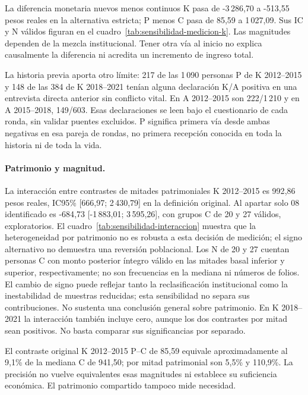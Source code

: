 La diferencia monetaria nuevos menos continuos K pasa de -3\,286{,}70 a
-513{,}55 pesos reales en la alternativa estricta; P menos C pasa de
85{,}59 a 1\,027{,}09. Sus IC y N válidos figuran en el
cuadro~\ref{tab:sensibilidad-medicion-k}. Las magnitudes dependen de la
mezcla institucional. Tener otra vía al inicio no explica causalmente
la diferencia ni acredita un incremento de ingreso total.

La historia previa aporta otro límite: 217 de las 1\,090 personas P de
K 2012--2015 y 148 de las 384 de K 2018--2021 tenían alguna declaración
K/A positiva en una entrevista directa anterior sin conflicto vital. En
A 2012--2015 son 222/1\,210 y en A 2015--2018, 149/603. Esas declaraciones
se leen bajo el cuestionario de cada ronda, sin validar puentes excluidos.
P significa primera vía desde ambas negativas en esa pareja de rondas,
no primera recepción conocida en toda la historia ni de toda la vida.

\paragraph{Patrimonio y magnitud.}
La interacción entre contrastes de mitades patrimoniales K 2012--2015
es 992{,}86 pesos reales, IC95\% [666{,}97; 2\,430{,}79] en la definición
original. Al apartar solo 08 identificado es -684{,}73
[-1\,883{,}01; 3\,595{,}26], con grupos C de 20 y 27 válidos, exploratorios.
El cuadro~\ref{tab:sensibilidad-interaccion} muestra que la heterogeneidad
por patrimonio no es robusta a esta decisión de medición; el signo alternativo
no demuestra una reversión poblacional. Los N de 20 y 27 cuentan personas C
con monto posterior íntegro válido en las mitades basal inferior y superior,
respectivamente; no son frecuencias en la mediana ni números de folios.
El cambio de signo puede reflejar tanto la reclasificación institucional
como la inestabilidad de muestras reducidas; esta sensibilidad no separa
sus contribuciones. No sustenta una conclusión general sobre patrimonio.
En K 2018--2021 la interacción también incluye
cero, aunque los dos contrastes por mitad sean positivos. No basta comparar
sus significancias por separado.

El contraste original K 2012--2015 P--C de 85{,}59 equivale aproximadamente
al 9{,}1\% de la mediana C de 941{,}50; por mitad patrimonial son 5{,}5\% y
110{,}9\%. La precisión no vuelve equivalentes esas magnitudes ni establece
su suficiencia económica. El patrimonio compartido tampoco mide necesidad.

